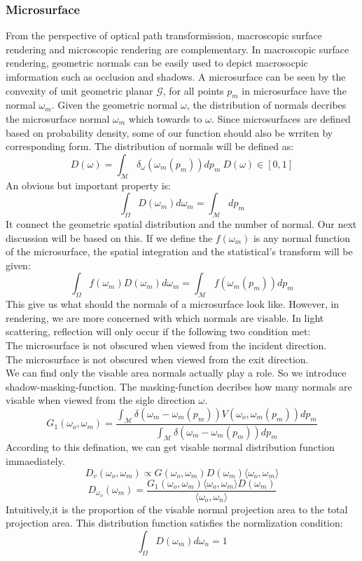 \documentclass[10pt,a4paper]{article}
\begin{document}
\subsubsection{Microsurface}
From the perspective of optical path transformission, macroscopic surface rendering and microscopic rendering are complementary. In macroscopic surface rendering, geometric normals can be easily used to depict macrosocpic imformation such as occlusion and shadows.
A microsurface can be seen by the convexity of unit geometric planar $\mathcal{G}$, for all points $p_m$ in microsurface have the normal $\omega_m$. Given the geometric normal $\omega$, the distribution of normals decribes the microsurface normal $\omega_m$ which towards to $\omega$. 
Since microsurfaces are defined based on probability density, some of our function should also be wrriten by corresponding form.
The distribution of normals will be defined as:
\[D(\omega)=\int_\mathcal{M}\delta_\omega(\omega_m(p_m))dp_m\:D(\omega)\in[0,1]\]
An obvious but important property is:
\[\int_\Omega D(\omega_m)d\omega_m=\int_\mathcal{M}dp_m\]
It connect the geometric spatial distribution and the number of normal. Our next discussion will be based on this.
If we define the $f(\omega_m)$ is any normal function of the microsurface, the spatial integration and the statistical's transform will be given:
\[\int_\Omega f(\omega_m)D(\omega_m)d\omega_m=\int_\mathcal{M}f(\omega_m(p_m))dp_m\]
This give us what should the normals of a microsurface look like.
However, in rendering, we are more concerned with which normals are visable. In light scattering, reflection will only occur if the following two 
condition met:\\
The microsurface is not obscured when viewed from the incident direction.\\
The microsurface is not obscured when viewed from the exit direction.\\
We can find only the visable area normals actually play a role. So we introduce shadow-masking-function.
The masking-function decribes how many normals are visable when viewed from the sigle direction $\omega$.
\[G_1(\omega_o,\omega_m)=\frac{\int_{\mathcal{M}}\delta(\omega_m-\omega_m(p_m))V(\omega_o,\omega_m(p_m))dp_m}{\int_{\mathcal{M}}\delta(\omega_m-\omega_m(p_m))dp_m}\]
According to this defination, we can get visable normal distribution function immaediately.
\[D_v(\omega_o,\omega_m)\propto G(\omega_o,\omega_m)D(\omega_m)\langle\omega_o,\omega_m\rangle\]
\[D_{\omega_o}(\omega_m)=\frac{G_1(\omega_o,\omega_m)\langle\omega_o,\omega_m\rangle D(\omega_m)}{\langle\omega_o,\omega_n\rangle}\]
Intuitively,it is the proportion of the visable normal projection area to the total projection area. This distribution function satisfies the normlization condition:
\[\int_{\Omega}D(\omega_m)d\omega_n=1\]
\end{document}
